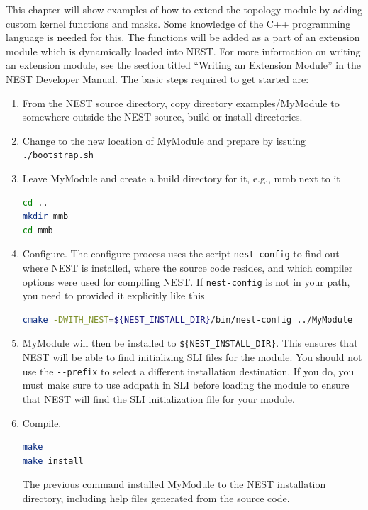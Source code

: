 \documentclass[a4paper,12pt]{report}
\begin{document}
This chapter will show examples of how to extend the topology module by
adding custom kernel functions and masks. Some knowledge of the C++
programming language is needed for this. The functions will be added as a
part of an extension module which is dynamically loaded into NEST. For more
information on writing an extension module, see the section titled
\href{http://nest.github.io/nest-simulator/extension_modules}{``Writing an Extension Module''}
in the NEST Developer Manual. The basic steps required to get started are:
\begin{enumerate}
\item From the NEST source directory, copy directory examples/MyModule to
  somewhere outside the NEST source, build or install directories.
\item Change to the new location of MyModule and prepare by issuing
  \lstinline!./bootstrap.sh!
\item Leave MyModule and create a build directory for it, e.g., mmb next to
  it
\begin{lstlisting}[language=bash]
cd ..
mkdir mmb
cd mmb
\end{lstlisting}
\item Configure. The configure process uses the script \lstinline!nest-config!
  to find out where NEST is installed, where the source code resides, and
  which compiler options were used for compiling NEST. If
  \lstinline!nest-config! is not in your path, you need to provided it
  explicitly like this
\begin{lstlisting}[language=bash]
cmake -DWITH_NEST=${NEST_INSTALL_DIR}/bin/nest-config ../MyModule
\end{lstlisting}
\item MyModule will then be installed to \lstinline!${NEST_INSTALL_DIR}!. This
  ensures that NEST will be able to find initializing SLI files for the
  module.  You should not use the \lstinline!--prefix! to select a different
  installation destination. If you do, you must make sure to use addpath in
  SLI before loading the module to ensure that NEST will find the SLI
  initialization file for your module.
\item Compile.
\begin{lstlisting}[language=bash]
make
make install
\end{lstlisting}
The previous command installed MyModule to the NEST installation directory, including help files generated from the source code. 
\end{enumerate}
\end{document}
